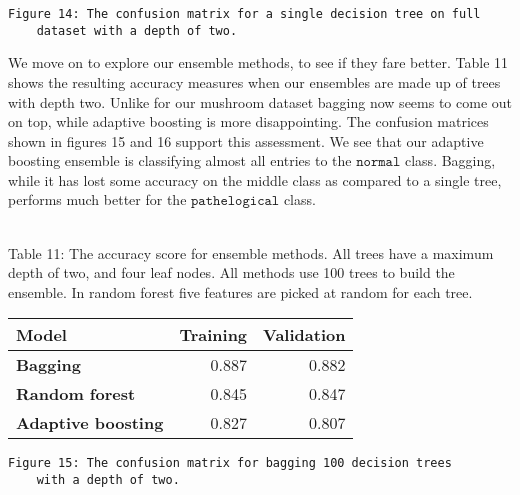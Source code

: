 \documentclass[11pt]{article}
\begin{document}
 \begin{center}
 \end{center}
  \begin{Verbatim}[commandchars=\\\{\}]
 	Figure 14: The confusion matrix for a single decision tree on full 
 	dataset with a depth of two.
 \end{Verbatim}
 

We move on to explore our ensemble methods, to see if they fare better. Table 11 shows the resulting accuracy measures when our ensembles are made up of trees with depth two. Unlike for our mushroom dataset bagging now seems to come out on top, while adaptive boosting is more disappointing. The confusion matrices shown in figures 15 and 16 support this assessment. We see that our adaptive boosting ensemble is classifying almost all entries to the $\texttt{normal}$ class. Bagging, while it has lost some accuracy on the middle class as compared to a single tree, performs much better for the $\texttt{pathelogical}$ class. 

{ \hspace*{\fill} \\}
Table 11: The accuracy score for ensemble methods. All trees have a maximum depth of two, and four leaf nodes. All methods use 100 trees to build the ensemble. In random forest five features are picked at random for each tree.
\begin{table}[h!]
	\begin{center}
		\label{tab:table1}
		\begin{tabular}{l|r|r}
			\textbf{Model}                                                 	& \textbf{Training} & \textbf{Validation}
			\\ \hline
			\textbf{Bagging}                             		             & 0.887        & 0.882              \\ \hline
			\textbf{Random forest}                                		     & 0.845        & 0.847              \\ \hline
			\textbf{Adaptive boosting}   							    	 & 0.827        & 0.807                \\ \hline
		\end{tabular}
	\end{center}
\end{table}
  \begin{center}
 \end{center}
   \begin{Verbatim}[commandchars=\\\{\}]
 	Figure 15: The confusion matrix for bagging 100 decision trees 
 	with a depth of two.
 \end{Verbatim}
 
\end{document}
